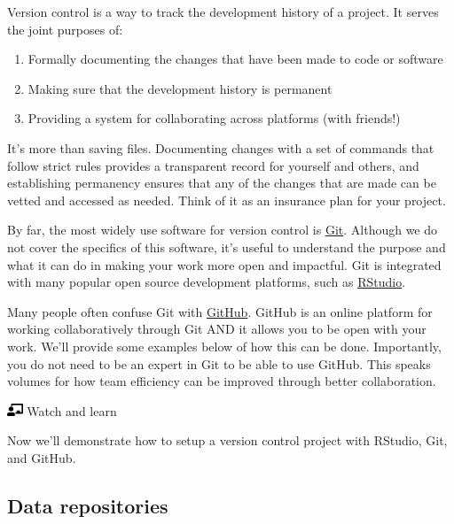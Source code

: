 \documentclass[
  letterpaper,
  DIV=11,
  numbers=noendperiod]{scrreprt}
\providecommand{\tightlist}{%
  \setlength{\itemsep}{0pt}\setlength{\parskip}{0pt}}\usepackage{longtable,booktabs,array}
\begin{document}
Version control is a way to track the development history of a project.
It serves the joint purposes of:

\begin{enumerate}
\def\labelenumi{\arabic{enumi}.}
\tightlist
\item
  Formally documenting the changes that have been made to code or
  software
\item
  Making sure that the development history is permanent
\item
  Providing a system for collaborating across platforms (with friends!)
\end{enumerate}

It's more than saving files. Documenting changes with a set of commands
that follow strict rules provides a transparent record for yourself and
others, and establishing permanency ensures that any of the changes that
are made can be vetted and accessed as needed. Think of it as an
insurance plan for your project.

By far, the most widely use software for version control is
\href{https://git-scm.com/}{Git}. Although we do not cover the specifics
of this software, it's useful to understand the purpose and what it can
do in making your work more open and impactful. Git is integrated with
many popular open source development platforms, such as
\href{https://support.rstudio.com/hc/en-us/articles/200532077-Version-Control-with-Git-and-SVN}{RStudio}.

Many people often confuse Git with
\href{https://www.github.com}{GitHub}. GitHub is an online platform for
working collaboratively through Git AND it allows you to be open with
your work. We'll provide some examples below of how this can be done.
Importantly, you do not need to be an expert in Git to be able to use
GitHub. This speaks volumes for how team efficiency can be improved
through better collaboration.

\includegraphics[width=1.25em,height=1em]{./collaborate_files/figure-pdf/fa-icon-5a0e5cd7bfbf585f8546c1ff4cebae73.pdf}
Watch and learn

Now we'll demonstrate how to setup a version control project with
RStudio, Git, and GitHub.

\hypertarget{data-repositories}{%
\subsection{Data repositories}\label{data-repositories}}
\end{document}
